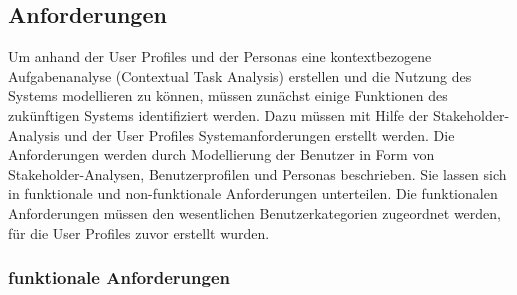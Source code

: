 	\subsection{Anforderungen}
	Um anhand der User Profiles und der Personas eine kontextbezogene Aufgabenanalyse (Contextual Task Analysis) erstellen und die Nutzung des Systems modellieren zu können, müssen zunächst einige Funktionen des zukünftigen Systems identifiziert werden. Dazu müssen mit Hilfe der Stakeholder-Analysis und der User Profiles Systemanforderungen erstellt werden.
	Die Anforderungen werden durch Modellierung der Benutzer in Form von Stakeholder-Analysen, Benutzerprofilen und Personas beschrieben. Sie lassen sich in funktionale und non-funktionale Anforderungen unterteilen. Die funktionalen Anforderungen müssen den wesentlichen Benutzerkategorien zugeordnet werden, für die User Profiles zuvor erstellt wurden.
	\subsubsection{funktionale Anforderungen}
